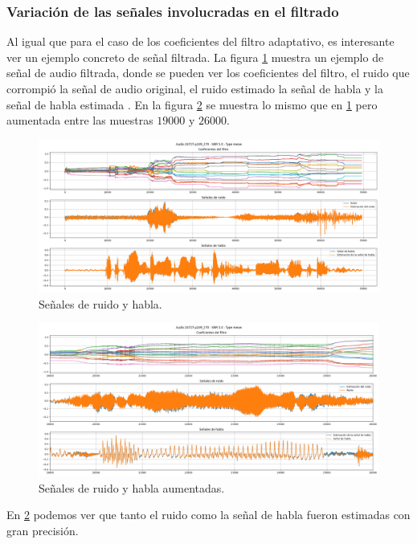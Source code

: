 \subsubsection{Variación de las señales involucradas en el filtrado}

Al igual que para el caso de los coeficientes del filtro adaptativo, es interesante ver un ejemplo concreto de señal filtrada. La figura \ref{fig:ch6_señal_ruido_habla} muestra un ejemplo de señal de audio filtrada, donde se pueden ver los coeficientes del filtro, el ruido que corrompió la señal de audio original, el ruido estimado la señal de habla y la señal de habla estimada . En la figura \ref{fig:ch6_señal_ruido_habla_aumentada} se muestra lo mismo que en \ref{fig:ch6_señal_ruido_habla} pero aumentada entre las muestras $19000$ y $26000$.

\begin{figure}
	\centering
	\centerline{\includegraphics[scale=0.35]{images/ch6/af/signals/signals.png}}
	\caption{Señales de ruido y habla.}
	\label{fig:ch6_señal_ruido_habla}
\end{figure}


\begin{figure}
	\centering
	\centerline{\includegraphics[scale=0.35]{images/ch6/af/signals/zoomed_signals.png}}
	\caption{Señales de ruido y habla aumentadas.}
	\label{fig:ch6_señal_ruido_habla_aumentada}
\end{figure}

En \ref{fig:ch6_señal_ruido_habla_aumentada} podemos ver que tanto el ruido como la señal de habla fueron estimadas con gran precisión.